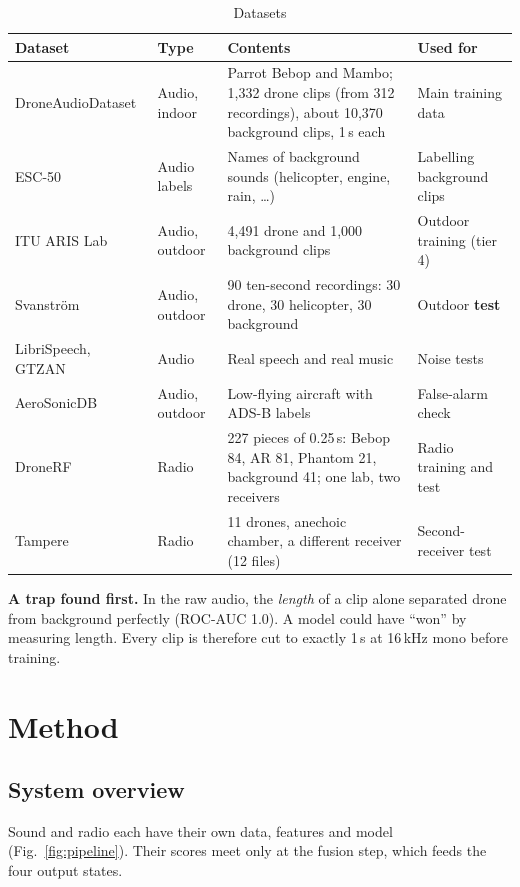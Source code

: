 \documentclass[conference,a4paper]{IEEEtran}
\begin{document}
\begin{table}[!t]
\centering\small
\caption{Datasets}
\label{tab:data}
\begin{tabularx}{\textwidth}{@{}L{3.2cm} L{2.8cm} Y L{3.6cm}@{}}
\toprule
Dataset & Type & Contents & Used for \\
\midrule
DroneAudioDataset~\cite{droneaudio} & Audio, indoor & Parrot Bebop and Mambo; 1,332 drone clips (from 312 recordings), about 10,370 background clips, 1\,s each & Main training data \\
ESC-50~\cite{esc50} & Audio labels & Names of background sounds (helicopter, engine, rain, \dots) & Labelling background clips \\
ITU ARIS Lab~\cite{aris} & Audio, outdoor & 4,491 drone and 1,000 background clips & Outdoor training (tier 4) \\
Svanstr\"om~\cite{svanstrom} & Audio, outdoor & 90 ten-second recordings: 30 drone, 30 helicopter, 30 background & Outdoor \textbf{test} \\
LibriSpeech, GTZAN & Audio & Real speech and real music & Noise tests \\
AeroSonicDB~\cite{aerosonic} & Audio, outdoor & Low-flying aircraft with ADS-B labels & False-alarm check \\
DroneRF~\cite{dronerf} & Radio & 227 pieces of 0.25\,s: Bebop 84, AR 81, Phantom 21, background 41; one lab, two receivers & Radio training and test \\
Tampere~\cite{tampere} & Radio & 11 drones, anechoic chamber, a different receiver (12 files) & Second-receiver test \\
\bottomrule
\end{tabularx}
\end{table}

\textbf{A trap found first.} In the raw audio, the \emph{length} of a clip alone separated drone
from background perfectly (ROC-AUC 1.0). A model could have ``won'' by measuring length. Every clip
is therefore cut to exactly 1\,s at 16\,kHz mono before training.

\section{Method}

\subsection{System overview}
Sound and radio each have their own data, features and model (Fig.~\ref{fig:pipeline}). Their
scores meet only at the fusion step, which feeds the four output states.
\end{document}
